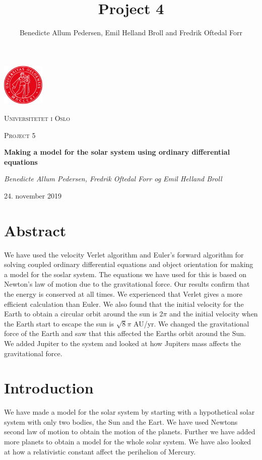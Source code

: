 \documentclass{article}
\title{Project 4}\vspace{-3ex}
\author{Benedicte Allum Pedersen, Emil Helland Broll and Fredrik Oftedal Forr}
\date{\vspace{-5ex}}
\begin{document}
\begin{titlepage}
  \centering
  \includegraphics[width=0.15\textwidth]{./pics/uio.png}\par\vspace{1cm}
  {\scshape\LARGE Universitetet i Oslo\par}
  \vspace{1cm}
  {\scshape\Large Project 5\par}
  \vspace{1.5cm}
  {\huge\bfseries Making a model for the solar system using ordinary differential equations\par}
  \vspace{2cm}
  {\Large\itshape Benedicte Allum Pedersen, Fredrik Oftedal Forr og Emil Helland Broll\par}
	\vfill

  \vfill
  {\large 24. november 2019\par}
\end{titlepage}

\section*{Abstract}
We have used the velocity Verlet algorithm and Euler's forward algorithm for solving coupled ordinary differential equations and object orientation for making a model for the soslar system. The equations we have used for this is based on Newton's law of motion due to the gravitational force. Our results confirm that the energy is conserved at all times. We experienced that Verlet gives a more efficient calculation than Euler. We also found that the initial velocity for the Earth to obtain a circular orbit around the sun is 2$\pi$ and the initial velocity when the Earth start to escape the sun is $\sqrt{8}\pi$ AU/yr. We changed the gravitational force of the Earth and saw that this affected the Earths orbit around the Sun. We added Jupiter to the system and looked at how Jupiters mass affects the gravitational force.

\tableofcontents

\newpage

\section{Introduction}
We have made a model for the solar system by starting with a hypothetical solar system with only two bodies, the Sun and the Eart. We have used Newtons second law of motion to obtain the motion of the planets. Further we have added more planets to obtain a model for the whole solar system. We have also looked at how a relativistic constant affect the perihelion of Mercury.
\end{document}
